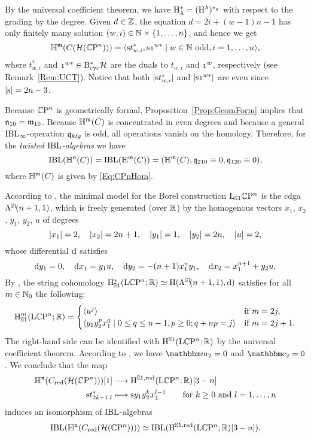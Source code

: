 \documentclass[\MainFolder/Text.tex]{subfiles}
\begin{document}
By the universal coefficient theorem, we have $\mathrm{H}_\lambda^* = (\mathrm{H}^\lambda)^{*_{\mathrm{g}}}$ with respect to the grading by the degree. Given $d\in \mathbb{Z}$, the equation $d= 2i + (w-1)n - 1$ has only finitely many solution $(w,i) \in \mathbb{N} \times \{1,\dotsc,n\}$, and hence we get
\begin{equation}\label{Eq:CPnHom}
\HIBL^\MC(\CycC(\Harm(\CP^n))) = \langle \Susp t_{w,i}^*, \Susp\NOne^{w*} \mid w\in \N \text{ odd}, i=1,\dotsc, n \rangle,
\end{equation}
where $t_{w,i}^*$ and $\NOne^{w*} \in \DBCyc \Harm$ are the duals to $t_{w,i}$ and $\NOne^{w}$, respectively (see Remark~\ref{Rem:UCT}). Notice that both $|\mathrm{s} t_{w,i}^*|$ and $\Abs{\Susp \NOne^{w*}}$ are even since $|\mathrm{s}| = 2n-3$.

Because $\mathbb{C}\mathrm{P}^n$ is geometrically formal, Proposition~\ref{Prop:GeomForm} implies that $\mathfrak{n}_{10} = \mathfrak{m}_{10}$. Because $\mathbb{H}^{\mathfrak{m}}(C)$ is concentrated in even degrees and because a general $\mathrm{IBL}_\infty$-operation $\mathfrak{q}_{klg}$ is odd, all operations vanish on the homology. Therefore, for the \emph{twisted $\mathrm{IBL}$-algebras} we have
\begin{equation*}
\mathrm{IBL}(\mathbb{H}^{\mathfrak{n}}(C)) = \mathrm{IBL}(\mathbb{H}^{\mathfrak{m}}(C)) = (\mathbb{H}^{\mathfrak{m}}(C), \mathfrak{q}_{210} \equiv 0, \mathfrak{q}_{120}\equiv 0),
\end{equation*}
where $\mathbb{H}^{\mathfrak{m}}(C)$ is given by \eqref{Eq:CPnHom}.

According to \cite[Section 3.1.2]{Basu2011}, the minimal model for the Borel construction $\mathrm{L}_{\mathbb{S}{1}} \mathbb{C}\mathrm{P}^n$ is the cdga $\Lambda^{\mathrlap{\Sph{1}}\hphantom{S}}(n+1,1)$, which is freely generated (over $\mathbb{R}$) by the homogenous vectors $x_1$, $x_2$, $y_1$, $y_2$, $u$ of degrees
\[ |x_1| = 2,\quad |x_2| = 2n+1,\quad |y_1| = 1,\quad |y_2| = 2n, \quad |u| = 2, \]
whose differential $\mathrm{d}$ satisfies
\[ \mathrm{d} y_1 = 0,\quad \mathrm{d} x_1 = y_1 u,\quad \mathrm{d} y_2 = -(n+1) x_1^n y_1,\quad \mathrm{d} x_2 = x_1^{n+1} + y_2 u. \]
By \cite[Theorem 3.6]{Basu2011}, the string cohomology $\StringCoH^*(\Loop \CP^n; \R)\simeq \H(\Lambda^{\mathrlap{\Sph{1}}\hphantom{S}}(n+1,1),\Dd)$ satisfies for all $m\in \mathbb{N}_0$ the following:
\begin{align*}
\mathrm{H}_{\mathbb{S}{1}}^m(\mathrm{L} \mathbb{C}\mathrm{P}^n; \mathbb{R}) = \begin{cases} 
\langle u^j \rangle & \text{if }m=2j, \\
\langle y_1 y_2^p x_1^q \mid 0\le q \le n-1, p\ge 0; q + n p = j\rangle & \text{if }m=2j+1.
\end{cases}
\end{align*}
The right-hand side can be identified with $\mathrm{H}^{\mathbb{S}{1}}(\mathrm{L} \mathbb{C}\mathrm{P}^n; \mathbb{R})$ by the universal coefficient theorem. According to \cite[Proposition 3.7]{Basu2011}, we have $\StringOp_2 = 0$ and $\StringCoOp_2 = 0$. We conclude that the map
\[\begin{aligned}
 \mathbb{H}^{\mathfrak{n}}(C_{\mathrm{red}}(\mathcal{H}(\mathbb{C}\mathrm{P}^n)))[1] & \longrightarrow \mathrm{H}^{\mathbb{S}{1}, \mathrm{red}}(\mathrm{L} \mathbb{C}\mathrm{P}^n; \mathbb{R})[3-n] \\
\mathrm{s} t^*_{2k+1,l} & \longmapsto \mathrm{s} y_1 y_2^k x_1^{l-1}\qquad\text{for }k\ge 0\text{ and }l=1,\dotsc, n
\end{aligned} \]
induces an isomorphism of $\mathrm{IBL}$-algebras
\[ \mathrm{IBL}(\mathbb{H}^{\mathfrak{n}}(C_{\mathrm{red}}(\mathcal{H}(\mathbb{C}\mathrm{P}^n)))) \simeq \mathrm{IBL}(\mathrm{H}^{\mathbb{S}{1}, \mathrm{red}}(\mathrm{L} \mathbb{C}\mathrm{P}^n; \mathbb{R})[3-n]). \]
\end{document}
